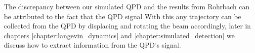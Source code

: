 The discrepancy between our simulated QPD and the results from 
Rohrbach can be attributed to the fact that the QPD signal  With this any trajectory can be collected from the QPD by displacing and 
rotating the beam accordingly, later in chapters \ref{chapter:langevin_dynamics} 
and \ref{chapter:simulated_detection} we discuss how to extract information 
from the QPD's signal.

